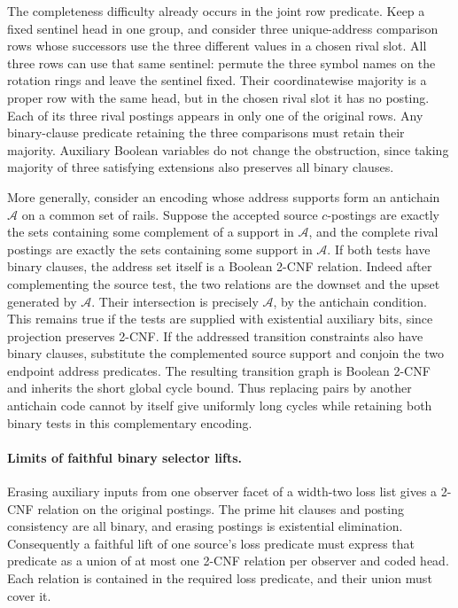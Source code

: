 The completeness difficulty already occurs in the
joint row predicate. Keep a fixed sentinel head in
one group, and consider three unique-address
comparison rows whose successors use the three
different values in a chosen rival slot. All three
rows can use that same sentinel: permute the
three symbol names on the rotation rings and leave
the sentinel fixed. Their coordinatewise majority
is a proper row with the same head, but in the
chosen rival slot it has no posting. Each of its
three rival postings appears in only one of the
original rows. Any binary-clause predicate
retaining the three comparisons must retain their
majority. Auxiliary Boolean variables do not
change the obstruction, since taking majority of
three satisfying extensions also preserves all
binary clauses.

More generally, consider an encoding whose address
supports form an antichain $\mathcal A$ on a common
set of rails. Suppose the accepted source
$c$-postings are exactly the sets containing
some complement of a support in $\mathcal A$,
and the complete rival postings are exactly the
sets containing some support in $\mathcal A$.
If both tests have binary clauses, the address set
itself is a Boolean 2-CNF relation. Indeed after
complementing the source test, the two relations
are the downset and the upset generated by
$\mathcal A$. Their intersection is precisely
$\mathcal A$, by the antichain condition. This
remains true if the tests are supplied with
existential auxiliary bits, since projection
preserves 2-CNF. If the addressed transition
constraints also have binary clauses, substitute
the complemented source support and conjoin the
two endpoint address predicates. The resulting
transition graph is Boolean 2-CNF and inherits
the short global cycle bound. Thus replacing
pairs by another antichain code cannot by itself
give uniformly long cycles while retaining both
binary tests in this complementary encoding.

\paragraph{Limits of faithful binary selector lifts.}
Erasing auxiliary inputs from one observer facet
of a width-two loss list gives a 2-CNF relation
on the original postings. The prime hit clauses
and posting consistency are all binary, and erasing
postings is existential elimination. Consequently
a faithful lift of one source's loss predicate
must express that predicate as a union of at most
one 2-CNF relation per observer and coded head.
Each relation is contained in the required loss
predicate, and their union must cover it.

